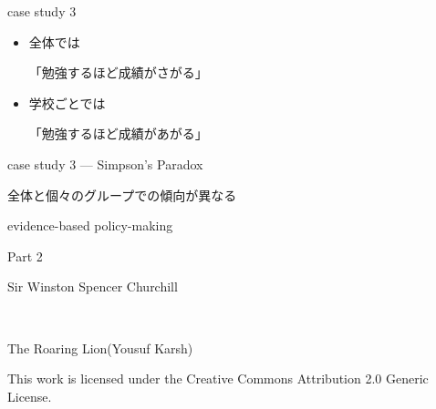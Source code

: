 \documentclass[
  ignorenonframetext,
]{beamer}
\begin{document}
\begin{frame}{case study 3}
\protect\hypertarget{case-study-3-9}{}
\LARGE

\begin{itemize}
\item[\textbullet] 全体では\par
「勉強するほど成績がさがる」
\bigskip\pause
\item[\textbullet] 学校ごとでは\par
「勉強するほど成績があがる」
\end{itemize}
\end{frame}

\begin{frame}{case study 3 --- Simpson's Paradox}
\protect\hypertarget{case-study-3-simpsons-paradox}{}
\LARGE

全体と個々のグループでの傾向が異なる

\normalsize
\end{frame}

\begin{frame}{evidence-based policy-making}
\protect\hypertarget{evidence-based-policy-making-2}{}
\Huge

\raggedleft
\scalebox{2}{\textcolor{softblue}{データ}}\scalebox{1.2}{に基づき}

\scalebox{2}{\textcolor{lightpurple}{根拠}}\scalebox{1.2}{を持って}

\scalebox{1.2}{仕事を前に進めよう!}
\end{frame}

\begin{frame}{Part 2}
\protect\hypertarget{part-2}{}
\Huge

\scalebox{2}{\textcolor{lightpurple}{文書}}
\end{frame}

\begin{frame}{Sir Winston Spencer Churchill}
\protect\hypertarget{sir-winston-spencer-churchill}{}
\raggedleft\Huge


\tiny

\raggedleft

The Roaring Lion(Yousuf Karsh) \vspace{-5pt}

This work is licensed under the Creative Commons Attribution 2.0 Generic
License.
\end{frame}
\end{document}
